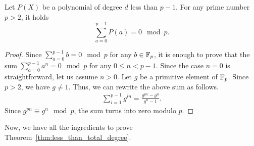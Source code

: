   \begin{lemma}\label{lem:sum_poly}
    Let $P(X)$ be a polynomial of degree $d$ less than $p-1$.
    For any prime number $p > 2$, it holds
    \[
      \sum_{a=0}^{p-1} P(a) = 0 \mod p.
    \]
  \end{lemma}
  \begin{proof}
    Since $\sum_{a=0}^{p-1} b = 0 \mod p$ for any $b \in \mathbb{F}_p$, it is enough to prove that the sum $\sum_{a=0}^{p-1} a^n = 0 \mod p$ for any $0 \leq n < p-1$.
    Since the case $n=0$ is straightforward, let us assume $n>0$. 
    Let $g$ be a primitive element of $\mathbb{F}_p$.
    Since $p > 2$, we have $g \ne 1$.
    Thus, we can rewrite the above sum as follows.
    \begin{align*}
      \sum_{i=1}^{p-1} g^{in} = \frac{g^{pn} - g^n}{g^n - 1}.
    \end{align*}
    Since $g^{pn} \equiv g^n \mod p$, the sum turns into zero modulo $p$.
  \end{proof}
  Now, we have all the ingredients to prove Theorem~\ref{thm:less_than_total_degree}.
